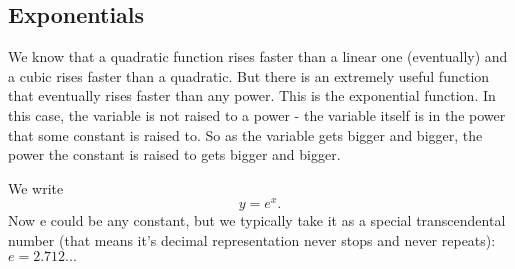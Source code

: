 \subsection*{Exponentials}
We know that a quadratic function rises faster than a linear one (eventually) and a cubic rises faster than a quadratic.
But there is an extremely useful function that eventually rises faster than any power.
This is the exponential function.
In this case, the variable is not raised to a power - the variable itself is in the power that some constant is raised to.
So as the variable gets bigger and bigger, the power the constant is raised to gets bigger and bigger.
\par
We write
\[ y = e^{x} \text{.} \]
Now e could be any constant, but we typically take it as a special transcendental number (that means it's decimal representation never stops and never repeats): $e = 2.712...$

